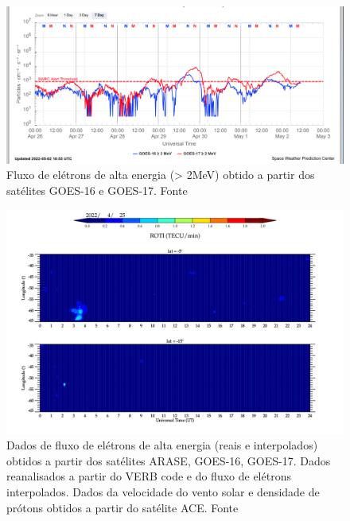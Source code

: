 \documentclass[11pt, oneside]{article}
\begin{document}
\begin{figure}[H]
    
                        \centering
   
                             \includegraphics[width=14cm]{./figures//figureRadBelts_0.png}

                             \caption{ Fluxo de elétrons de alta energia (> 2MeV) obtido a partir dos satélites GOES-16 e GOES-17. Fonte}
                        \end{figure}

                     \begin{figure}[H]
    
                        \centering
   
                             \includegraphics[width=14cm]{./figures//figureRadBelts_1.png}

                             \caption{ Dados de fluxo de elétrons de alta energia (reais e interpolados) obtidos a partir dos satélites ARASE, GOES-16, GOES-17. Dados reanalisados a partir do VERB code e do fluxo de elétrons interpolados. Dados da velocidade do vento solar e densidade de prótons obtidos a partir do satélite ACE. Fonte}
                        \end{figure}
\end{document}
